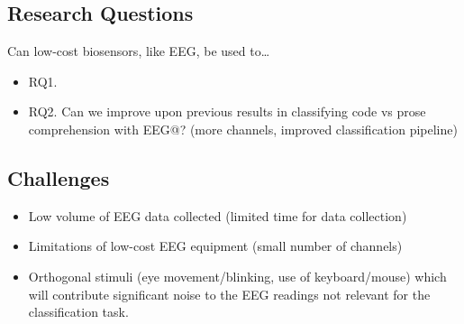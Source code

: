 \documentclass{IEEEtran}
\begin{document}
\begin{refsection}



\subsection{Research Questions}


Can low-cost biosensors, like EEG, be used to\ldots

\begin{itemize}
    \item RQ1. \RQmain{}
    \item RQ2. Can we improve upon previous results in classifying code vs prose comprehension with EEG@? (more channels, improved classification pipeline)
\end{itemize}

\subsection{Challenges}

\begin{itemize}
    \item Low volume of EEG data collected (limited time for data collection)
    \item Limitations of low-cost EEG equipment (small number of channels)
    \item Orthogonal stimuli (eye movement/blinking, use of keyboard/mouse) which will contribute significant noise to the EEG readings not relevant for the classification task.
\end{itemize}


\end{refsection}
\end{document}
